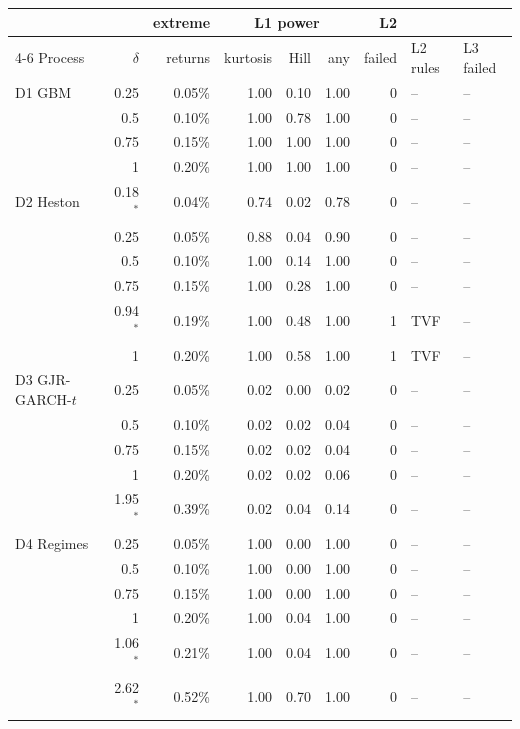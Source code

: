 \begin{tabular}{lrrrrrrll}
\toprule
& & extreme & \multicolumn{3}{c}{L1 power} & L2 & & \\
\cmidrule(lr){4-6}
Process & $\delta$ & returns & kurtosis & Hill & any & failed & L2 rules & L3 failed \\
\midrule
D1 GBM & 0.25 & 0.05\% & 1.00 & 0.10 & 1.00 & 0 & -- & -- \\
 & 0.5 & 0.10\% & 1.00 & 0.78 & 1.00 & 0 & -- & -- \\
 & 0.75 & 0.15\% & 1.00 & 1.00 & 1.00 & 0 & -- & -- \\
 & 1 & 0.20\% & 1.00 & 1.00 & 1.00 & 0 & -- & -- \\
\addlinespace
D2 Heston & 0.18$^{\ast}$ & 0.04\% & 0.74 & 0.02 & 0.78 & 0 & -- & -- \\
 & 0.25 & 0.05\% & 0.88 & 0.04 & 0.90 & 0 & -- & -- \\
 & 0.5 & 0.10\% & 1.00 & 0.14 & 1.00 & 0 & -- & -- \\
 & 0.75 & 0.15\% & 1.00 & 0.28 & 1.00 & 0 & -- & -- \\
 & 0.94$^{\ast}$ & 0.19\% & 1.00 & 0.48 & 1.00 & 1 & TVF & -- \\
 & 1 & 0.20\% & 1.00 & 0.58 & 1.00 & 1 & TVF & -- \\
\addlinespace
D3 GJR-GARCH-$t$ & 0.25 & 0.05\% & 0.02 & 0.00 & 0.02 & 0 & -- & -- \\
 & 0.5 & 0.10\% & 0.02 & 0.02 & 0.04 & 0 & -- & -- \\
 & 0.75 & 0.15\% & 0.02 & 0.02 & 0.04 & 0 & -- & -- \\
 & 1 & 0.20\% & 0.02 & 0.02 & 0.06 & 0 & -- & -- \\
 & 1.95$^{\ast}$ & 0.39\% & 0.02 & 0.04 & 0.14 & 0 & -- & -- \\
\addlinespace
D4 Regimes & 0.25 & 0.05\% & 1.00 & 0.00 & 1.00 & 0 & -- & -- \\
 & 0.5 & 0.10\% & 1.00 & 0.00 & 1.00 & 0 & -- & -- \\
 & 0.75 & 0.15\% & 1.00 & 0.00 & 1.00 & 0 & -- & -- \\
 & 1 & 0.20\% & 1.00 & 0.04 & 1.00 & 0 & -- & -- \\
 & 1.06$^{\ast}$ & 0.21\% & 1.00 & 0.04 & 1.00 & 0 & -- & -- \\
 & 2.62$^{\ast}$ & 0.52\% & 1.00 & 0.70 & 1.00 & 0 & -- & -- \\
\bottomrule
\end{tabular}

